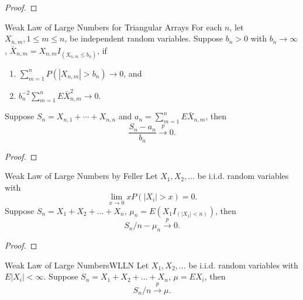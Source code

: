 \begin{proof}
    
\end{proof}

\begin{theorem}{Weak Law of Large Numbers for Triangular Arrays}{}
    For each $n$, let $X_{n,m},1\leq m\leq n$, be independent random variables. Suppose $b_n>0$ with $b_n\rightarrow\infty$, $\bar{X}_{n,m}=X_{n,m}I_{\left(X_{n,m}\leq b_n\right)}$, if
    \begin{enumerate}
        \item $\sum_{m=1}^{n}P\left(\left|X_{n,m}\right|>b_{n}\right)\rightarrow 0$, and
        \item $b_{n}^{-2}\sum_{m=1}^{n}E\bar{X}_{n,m}^{2}\rightarrow 0$.
    \end{enumerate}
    Suppose $S_{n}=X_{n, 1}+\cdots+X_{n,n}$ and $a_{n}=\sum_{m=1}^{n}E\bar{X}_{n,m}$, then
    \begin{equation}
        \frac{S_n-a_n}{b_n}\stackrel{p}{\rightarrow}0.
    \end{equation}
\end{theorem}

\begin{proof}
    
\end{proof}

\begin{theorem}{Weak Law of Large Numbers by Feller}{}
    Let $X_1,X_2,\ldots$ be i.i.d. random variables with
    \begin{equation}
        \lim_{x\rightarrow 0}xP(|X_i|>x)=0.
    \end{equation}
    Suppose $S_n=X_1+X_2+\ldots+X_n$, $\mu_n=E\left(X_1I_{(|X_1|<n)}\right)$, then
    \begin{equation}
        S_n/n-\mu_n\stackrel{p}{\rightarrow}0.
    \end{equation}
\end{theorem}

\begin{proof}
    
\end{proof}

\begin{theorem}{Weak Law of Large Numbers}{WLLN}
    Let $X_1,X_2,\ldots$ be i.i.d. random variables with $E|X_i|<\infty$. Suppose $S_n=X_1+X_2+\ldots+X_n$, $\mu=EX_i$, then
    \begin{equation}
        S_n/n\stackrel{p}{\rightarrow}\mu.
    \end{equation}
\end{theorem}


